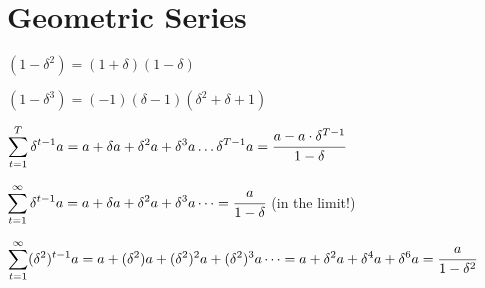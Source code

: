 \documentclass{report}
\begin{document}
\bigskip \bigskip

\section*{Geometric Series}\medskip

$(1 - \delta^2) = (1 + \delta)(1-\delta)$ \bigskip

$(1 - \delta^3) = (-1)(\delta - 1)(\delta^2 + \delta + 1)$ \bigskip

$\displaystyle\sum_{t=1}^T \delta^{t-1} a = a + \delta a + \delta^2 a + \delta^3 a \dots \delta^{T-1}a = \cfrac{a - a \cdot \delta^{T-1}}{1 - \delta}$ \bigskip

$\displaystyle\sum_{t=1}^\infty \delta^{t-1} a = a + \delta a + \delta^2 a + \delta^3 a \dots = \cfrac{a}{1 - \delta}$ \hspace{10pt} (in the limit!) \bigskip

$\displaystyle\sum_{t=1}^\infty (\delta^2)^{t-1} a = a + (\delta^2) a + (\delta^2)^2 a + (\delta^2)^3 a \dots = a + \delta^2 a + \delta^4 a + \delta^6 a = \cfrac{a}{1 - \delta^2}$ \bigskip
\end{document}
